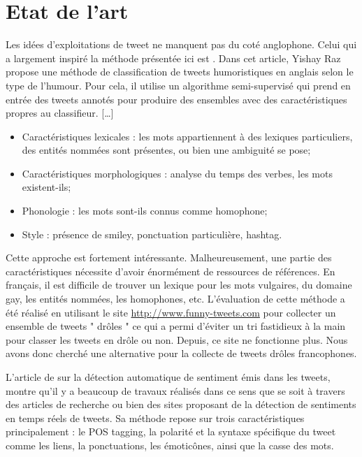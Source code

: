 \documentclass[10pt,a4paper,twoside]{article}
\begin{document}
\section{Etat de l'art}
\label{art}
Les idées d’exploitations de tweet ne manquent pas du coté anglophone. Celui qui a largement inspiré la méthode présentée ici est \cite{Raz12}.  Dans cet article, Yishay Raz propose une méthode de classification de tweets humoristiques en anglais selon le type de l’humour. Pour cela, il utilise un algorithme semi-supervisé qui prend en entrée des tweets annotés pour produire des ensembles avec des caractéristiques propres au classifieur.  […]

\begin{itemize}
\item Caractéristiques lexicales : les mots appartiennent à des lexiques particuliers, des entités nommées sont présentes, ou bien une ambiguité se pose;
\item Caractéristiques morphologiques : analyse du temps des verbes, les mots existent-ils;
\item Phonologie : les mots sont-ils connus comme homophone;
\item Style : présence de smiley, ponctuation particulière, hashtag.
\end{itemize}
Cette approche est fortement intéressante. Malheureusement, une partie des caractéristiques nécessite d’avoir énormément de ressources de références. En français, il est difficile de trouver un lexique pour les mots vulgaires, du domaine gay, les entités nommées, les homophones, etc. 
L’évaluation de cette méthode a été réalisé en utilisant le site \url{ http://www.funny-tweets.com} pour collecter un ensemble de tweets " drôles " ce qui a permi d’éviter un tri fastidieux à la main pour classer les tweets en drôle ou non. Depuis, ce site ne fonctionne plus. Nous avons donc cherché une alternative pour la collecte de tweets drôles francophones.

L’article de \cite{Barbosa2010} sur la détection automatique de sentiment émis dans les tweets, montre qu’il y a beaucoup de travaux réalisés dans ce sens que se soit à travers des articles de recherche ou bien des sites proposant de la détection de sentiments en temps réels de tweets.  Sa méthode repose sur trois caractéristiques principalement : le POS tagging, la polarité et la syntaxe spécifique du tweet comme les liens, la ponctuations, les émoticônes, ainsi que la casse des mots. 
\end{document}
